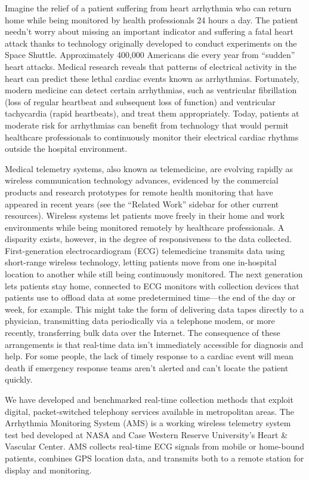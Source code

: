 \documentclass[a4paper,12pt]{article}
\begin{document}
Imagine the relief of a patient suffering from heart arrhythmia who can return home while being monitored by health professionals 24 hours a day. The patient needn’t worry about missing an important indicator and suffering a fatal heart attack thanks to technology originally developed to conduct experiments on the Space Shuttle. Approximately 400,000 Americans die every year from “sudden” heart attacks. Medical research reveals that patterns of electrical activity in the heart can predict these lethal cardiac events known as arrhythmias. Fortunately, modern medicine can detect certain arrhythmias, such as ventricular fibrillation (loss of regular heartbeat and subsequent loss of function) and ventricular tachycardia (rapid heartbeats), and treat them appropriately. Today, patients at moderate risk for arrhythmias can benefit from technology that would permit healthcare professionals to continuously monitor their electrical cardiac rhythms outside the hospital environment.

Medical telemetry systems, also known as telemedicine, are evolving rapidly as wireless communication technology advances, evidenced by the commercial products and research prototypes for remote health monitoring that have appeared in recent years (see the “Related Work” sidebar for other current resources). Wireless systems let patients move freely in their home and work environments while being monitored remotely by healthcare professionals. A disparity exists, however, in the degree of responsiveness to the data collected. First-generation electrocardiogram (ECG) telemedicine transmits data using short-range wireless technology, letting patients move from one in-hospital location to another while still being continuously monitored. The next generation lets patients stay home, connected to ECG monitors with collection devices that patients use to offload data at some predetermined time—the end of the day or week, for example. This might take the form of delivering data tapes directly to a physician, transmitting data periodically via a telephone modem, or more recently, transferring bulk data over the Internet. The consequence of these arrangements is that real-time data isn’t immediately accessible for diagnosis and help. For some people, the lack of timely response to a cardiac event will mean death if emergency response teams aren’t alerted and can’t locate the patient quickly.

We have developed and benchmarked real-time collection methods that exploit digital, packet-switched telephony services available in metropolitan areas. The Arrhythmia Monitoring System (AMS) is a working wireless telemetry system test bed developed at NASA and Case Western Reserve University’s Heart & Vascular Center. AMS collects real-time ECG signals from mobile or home-bound patients, combines GPS location data, and transmits both to a remote station for display and monitoring.
\end{document}
